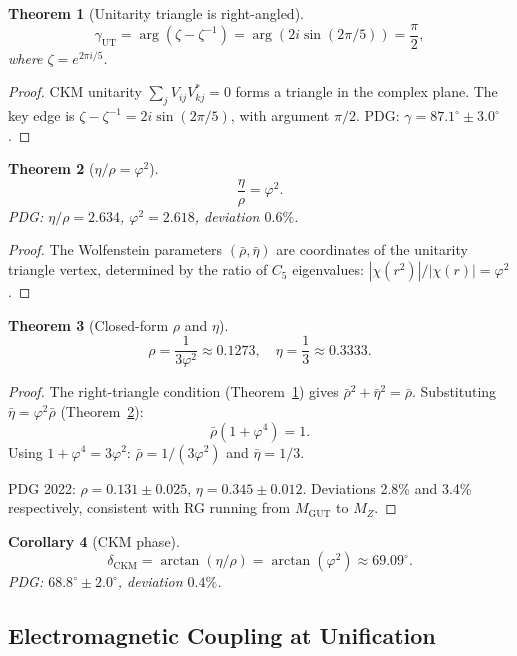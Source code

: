 \documentclass[11pt,a4paper]{article}
\newtheorem{theorem}{Theorem}
\newtheorem{corollary}[theorem]{Corollary}
\begin{document}
\begin{theorem}[Unitarity triangle is right-angled]
\label{thm:gamma}
\[
\gamma_{\text{UT}} = \arg(\zeta - \zeta^{-1}) = \arg(2i\sin(2\pi/5)) = \frac{\pi}{2},
\]
where $\zeta = e^{2\pi i/5}$.
\end{theorem}

\begin{proof}
CKM unitarity $\sum_j V_{ij}V_{kj}^* = 0$ forms a triangle in the complex plane. The key edge is $\zeta - \zeta^{-1} = 2i\sin(2\pi/5)$, with argument $\pi/2$. PDG: $\gamma = 87.1^\circ \pm 3.0^\circ$.
\end{proof}

\begin{theorem}[$\eta/\rho = \varphi^2$]
\label{thm:etarho}
\[
\frac{\eta}{\rho} = \varphi^2.
\]
PDG: $\eta/\rho = 2.634$, $\varphi^2 = 2.618$, deviation $0.6\%$.
\end{theorem}

\begin{proof}
The Wolfenstein parameters $(\bar\rho, \bar\eta)$ are coordinates of the unitarity triangle vertex, determined by the ratio of $C_5$ eigenvalues: $|\chi(r^2)|/|\chi(r)| = \varphi^2$.
\end{proof}

\begin{theorem}[Closed-form $\rho$ and $\eta$]
\label{thm:rhoeta}
\[
\boxed{\rho = \frac{1}{3\varphi^2} \approx 0.1273, \quad \eta = \frac{1}{3} \approx 0.3333.}
\]
\end{theorem}

\begin{proof}
The right-triangle condition (Theorem~\ref{thm:gamma}) gives $\bar\rho^2 + \bar\eta^2 = \bar\rho$. Substituting $\bar\eta = \varphi^2 \bar\rho$ (Theorem~\ref{thm:etarho}):
\[
\bar\rho(1 + \varphi^4) = 1.
\]
Using $1 + \varphi^4 = 3\varphi^2$: $\bar\rho = 1/(3\varphi^2)$ and $\bar\eta = 1/3$.

PDG 2022: $\rho = 0.131 \pm 0.025$, $\eta = 0.345 \pm 0.012$. Deviations 2.8\% and 3.4\% respectively, consistent with RG running from $M_{\text{GUT}}$ to $M_Z$.
\end{proof}

\begin{corollary}[CKM phase]
\[
\delta_{\text{CKM}} = \arctan(\eta/\rho) = \arctan(\varphi^2) \approx 69.09^\circ.
\]
PDG: $68.8^\circ \pm 2.0^\circ$, deviation $0.4\%$.
\end{corollary}

\subsection{Electromagnetic Coupling at Unification}
\end{document}
